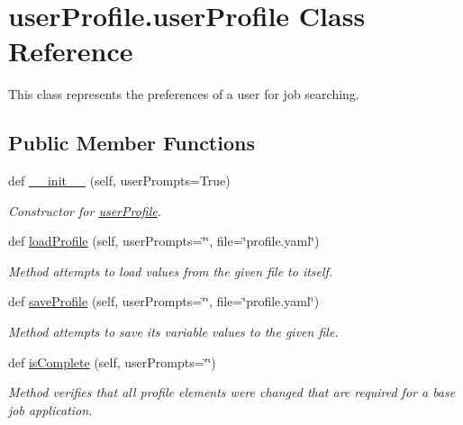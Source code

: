 \hypertarget{classuserProfile_1_1userProfile}{}\section{user\+Profile.\+user\+Profile Class Reference}
\label{classuserProfile_1_1userProfile}


This class represents the preferences of a user for job searching.  


\subsection*{Public Member Functions}
\begin{DoxyCompactItemize}
\item 
def \hyperlink{classuserProfile_1_1userProfile_acc3074e2b18f583f4c29112dc8c7ac10}{\+\_\+\+\_\+init\+\_\+\+\_\+} (self, user\+Prompts=True)
\begin{DoxyCompactList}\small\item\em Constructor for \hyperlink{classuserProfile_1_1userProfile}{user\+Profile}. \end{DoxyCompactList}\item 
def \hyperlink{classuserProfile_1_1userProfile_a7243a67eaec172d035828f95779b9534}{load\+Profile} (self, user\+Prompts=\char`\"{}\char`\"{}, file=\char`\"{}profile.\+yaml\char`\"{})
\begin{DoxyCompactList}\small\item\em Method attempts to load values from the given file to itself. \end{DoxyCompactList}\item 
def \hyperlink{classuserProfile_1_1userProfile_aabe8e582214f44b0315fee65fb97a5a3}{save\+Profile} (self, user\+Prompts=\char`\"{}\char`\"{}, file=\char`\"{}profile.\+yaml\char`\"{})
\begin{DoxyCompactList}\small\item\em Method attempts to save its variable values to the given file. \end{DoxyCompactList}\item 
def \hyperlink{classuserProfile_1_1userProfile_a805c57945934e5b839077ee8d8edfe5d}{is\+Complete} (self, user\+Prompts=\char`\"{}\char`\"{})
\begin{DoxyCompactList}\small\item\em Method verifies that all profile elements were changed that are required for a base job application. \end{DoxyCompactList}\item 

\end{DoxyCompactItemize}
